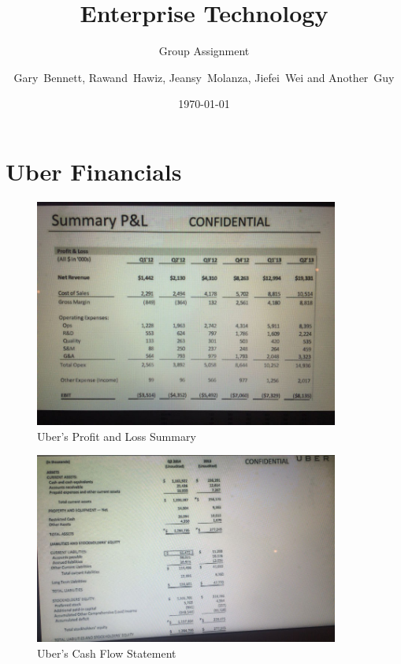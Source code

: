 \documentclass{lboro}
\title{Enterprise Technology}
\subtitle{Group Assignment}
\author{Gary~Bennett, Rawand~Hawiz, Jeansy~Molanza, Jiefei~Wei and Another~Guy}
\date{\today}
\begin{document}
  \maketitle

  \frontmatter
    \tableofcontents
    \listoffigures
    \listoftables

  \mainmatter
    
    
    
    

  \backmatter
    \printbibliography[heading=bibintoc]
    \appendix

      \chapter{Uber Financials}

        \begin{figure}
          \centering
          \begin{minipage}{10cm}
            \centering
            \includegraphics[width=10cm]{inc/uber_profit_loss.png}
            \caption[Uber's Profit and Loss Summary]{Uber's Profit and Loss Summary~\parencite{uber2015b}}
            \label{fig:uber_profit_loss}
          \end{minipage}
        \end{figure}


        \begin{figure}
          \centering
          \begin{minipage}{10cm}
            \centering
            \includegraphics[width=10cm]{inc/uber_cash_flow.png}
            \caption[Uber's Cash Flow Statement]{Uber's Cash Flow Statement~\parencite{uber2015b}}
            \label{fig:uber_cash_flow}
          \end{minipage}
        \end{figure}
\end{document}
